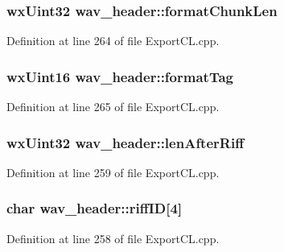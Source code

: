 \subsubsection[{\texorpdfstring{format\+Chunk\+Len}{formatChunkLen}}]{\setlength{\rightskip}{0pt plus 5cm}wx\+Uint32 wav\+\_\+header\+::format\+Chunk\+Len}\hypertarget{structwav__header_a2de7a0eda0c7197fc3f3eca5b088a5e4}{}\label{structwav__header_a2de7a0eda0c7197fc3f3eca5b088a5e4}


Definition at line 264 of file Export\+C\+L.\+cpp.

\subsubsection[{\texorpdfstring{format\+Tag}{formatTag}}]{\setlength{\rightskip}{0pt plus 5cm}wx\+Uint16 wav\+\_\+header\+::format\+Tag}\hypertarget{structwav__header_a7b766f589966d872eee71b73a1299f43}{}\label{structwav__header_a7b766f589966d872eee71b73a1299f43}


Definition at line 265 of file Export\+C\+L.\+cpp.

\subsubsection[{\texorpdfstring{len\+After\+Riff}{lenAfterRiff}}]{\setlength{\rightskip}{0pt plus 5cm}wx\+Uint32 wav\+\_\+header\+::len\+After\+Riff}\hypertarget{structwav__header_a7143122f9e6f8e92c21dc1dd45424673}{}\label{structwav__header_a7143122f9e6f8e92c21dc1dd45424673}


Definition at line 259 of file Export\+C\+L.\+cpp.

\subsubsection[{\texorpdfstring{riff\+ID}{riffID}}]{\setlength{\rightskip}{0pt plus 5cm}char wav\+\_\+header\+::riff\+ID\mbox{[}4\mbox{]}}\hypertarget{structwav__header_a46f51a7f8983f78160a17d7b8dbd9c32}{}\label{structwav__header_a46f51a7f8983f78160a17d7b8dbd9c32}


Definition at line 258 of file Export\+C\+L.\+cpp.


